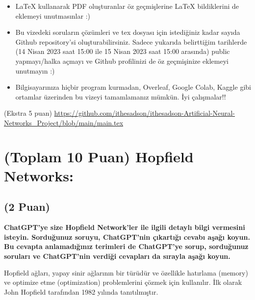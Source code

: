 \documentclass[11pt]{article}
\begin{document}
\begin{itemize}
    \item LaTeX kullanarak PDF oluşturanlar öz geçmişlerine LaTeX bildiklerini de eklemeyi unutmasınlar :)
    \item Bu vizedeki soruların çözümleri ve tex dosyası için istediğiniz kadar sayıda Github repository'si oluşturabilirsiniz. Sadece yukarıda belirttiğim tarihlerde (14 Nisan 2023 saat 15:00 ile 15 Nisan 2023 saat 15:00 arasında) public yapmayı/halka açmayı ve Github profilinizi de öz geçmişinize eklemeyi unutmayın :)
    \item Bilgisayarınıza hiçbir program kurmadan, Overleaf, Google Colab, Kaggle gibi ortamlar üzerinden bu vizeyi tamamlamanız mümkün. İyi çalışmalar!!
\end{itemize}

(Ekstra 5 puan) \url{https://github.com/ithesadson/ithesadson-Artificial-Neural-Networks_Project/blob/main/main.tex}

\newpage
\section{(Toplam 10 Puan) Hopfield Networks:}

\subsection{(2 Puan)} \textbf{ChatGPT’ye size Hopfield Network’ler ile ilgili detaylı bilgi vermesini isteyin. Sorduğunuz soruyu, ChatGPT'nin çıkartığı cevabı aşağı koyun. Bu cevapta anlamadığınız terimleri de ChatGPT’ye sorup, sorduğunuz soruları ve ChatGPT’nin verdiği cevapları da sırayla aşağı koyun.}

Hopfield ağları, yapay sinir ağlarının bir türüdür ve özellikle hatırlama (memory) ve optimize etme (optimization) problemlerini çözmek için kullanılır. İlk olarak John Hopfield tarafından 1982 yılında tanıtılmıştır.
\end{document}
